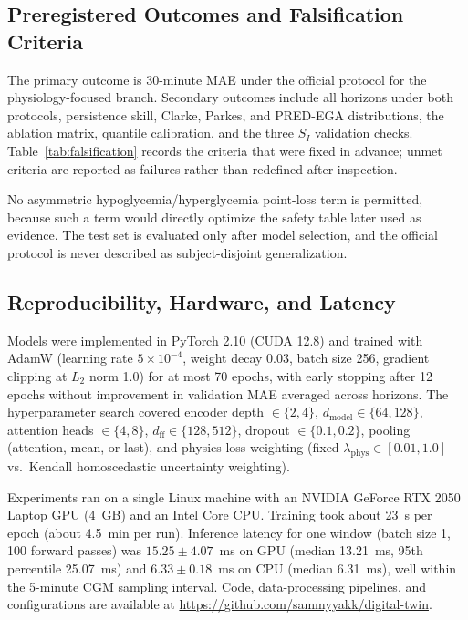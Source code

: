 \documentclass[journal]{IEEEtran}
\begin{document}
\subsection{Preregistered Outcomes and Falsification Criteria}

The primary outcome is 30-minute MAE under the official protocol for the physiology-focused branch. Secondary outcomes include all horizons under both protocols, persistence skill, Clarke, Parkes, and PRED-EGA distributions, the ablation matrix, quantile calibration, and the three $S_I$ validation checks. Table~\ref{tab:falsification} records the criteria that were fixed in advance; unmet criteria are reported as failures rather than redefined after inspection.

No asymmetric hypoglycemia/hyperglycemia point-loss term is permitted, because such a term would directly optimize the safety table later used as evidence. The test set is evaluated only after model selection, and the official protocol is never described as subject-disjoint generalization.

\subsection{Reproducibility, Hardware, and Latency}

Models were implemented in PyTorch 2.10 (CUDA 12.8) and trained with AdamW (learning rate $5 \times 10^{-4}$, weight decay 0.03, batch size 256, gradient clipping at $L_2$ norm 1.0) for at most 70 epochs, with early stopping after 12 epochs without improvement in validation MAE averaged across horizons. The hyperparameter search covered encoder depth $\in \{2, 4\}$, $d_{\text{model}} \in \{64, 128\}$, attention heads $\in \{4, 8\}$, $d_{\text{ff}} \in \{128, 512\}$, dropout $\in \{0.1, 0.2\}$, pooling (attention, mean, or last), and physics-loss weighting (fixed $\lambda_{\text{phys}} \in [0.01, 1.0]$ vs.\ Kendall homoscedastic uncertainty weighting).

Experiments ran on a single Linux machine with an NVIDIA GeForce RTX 2050 Laptop GPU (4~GB) and an Intel Core CPU. Training took about 23~s per epoch (about 4.5~min per run). Inference latency for one window (batch size 1, 100 forward passes) was $15.25 \pm 4.07$~ms on GPU (median 13.21~ms, 95th percentile 25.07~ms) and $6.33 \pm 0.18$~ms on CPU (median 6.31~ms), well within the 5-minute CGM sampling interval. Code, data-processing pipelines, and configurations are available at \url{https://github.com/sammyyakk/digital-twin}.
\end{document}
